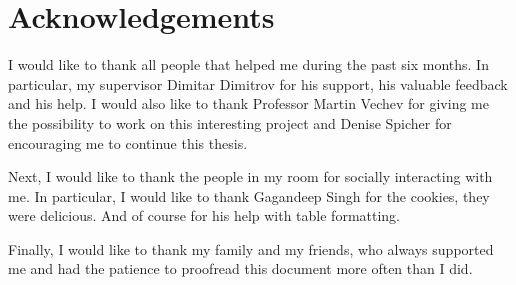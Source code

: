 \chapter{Acknowledgements}

I would like to thank all people that helped me during the past six months. In particular, my supervisor Dimitar Dimitrov for his support, his valuable feedback and his help. I would also like to thank Professor Martin Vechev for giving me the possibility to work on this interesting project and Denise Spicher for encouraging me to continue this thesis.

Next, I would like to thank the people in my room for socially interacting with me. In particular, I would like to thank Gagandeep Singh for the cookies, they were delicious. And of course for his help with table formatting.

Finally, I would like to thank my family and my friends, who always supported me and had the patience to proofread this document more often than I did.